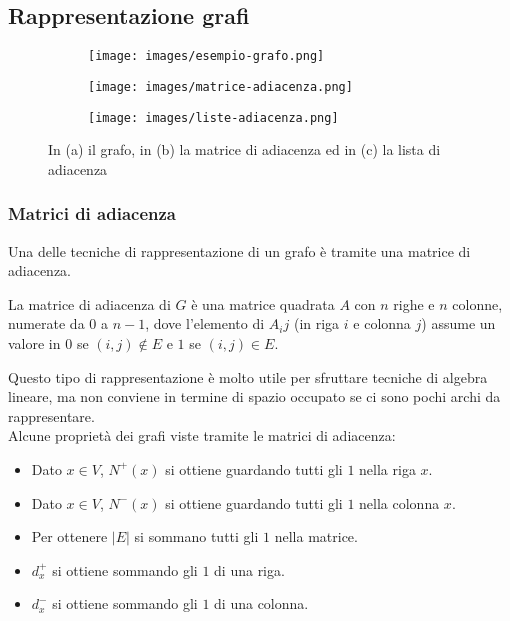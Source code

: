 \subsection{Rappresentazione grafi}
\begin{figure}[h!]
    \centering
    \begin{subfigure}{.3\textwidth}
        \centering
        \texttt{[image: images/esempio-grafo.png]}
        \caption{}
    \end{subfigure}
    \hfill
    \begin{subfigure}{.3\textwidth}
        \centering
        \texttt{[image: images/matrice-adiacenza.png]}
        \caption{}
    \end{subfigure}
    \hfill
    \begin{subfigure}{.3\textwidth}
        \centering
        \texttt{[image: images/liste-adiacenza.png]}
        \caption{}
    \end{subfigure}
    \vspace{-5pt}
    \caption{In (a) il grafo, in (b) la matrice di adiacenza ed in (c) la lista di adiacenza}
\end{figure}
\subsubsection{Matrici di adiacenza}
Una delle tecniche di rappresentazione di un grafo è tramite una matrice di adiacenza.
\begin{definition}
    La matrice di adiacenza di $G$ è una matrice quadrata $A$ con $n$ righe e $n$ colonne, numerate da $0$ a $n-1$, dove l'elemento di $A_ij$ (in riga $i$ e colonna $j$) assume un valore in $0$ se $(i,j) \notin E$ e $1$ se $(i,j) \in E$.
\end{definition}
Questo tipo di rappresentazione è molto utile per sfruttare tecniche di algebra lineare, ma non conviene in termine di spazio occupato se ci sono pochi archi da rappresentare.\\
Alcune proprietà dei grafi viste tramite le matrici di adiacenza:
\begin{itemize}
    \item Dato $x \in V$, $N^+(x)$ si ottiene guardando tutti gli $1$ nella riga $x$.
    \item Dato $x \in V$, $N^-(x)$ si ottiene guardando tutti gli $1$ nella colonna $x$.
    \item Per ottenere $|E|$ si sommano tutti gli $1$ nella matrice.
    \item $d^+_x$ si ottiene sommando gli $1$ di una riga.
    \item $d^-_x$ si ottiene sommando gli $1$ di una colonna.
\end{itemize}

